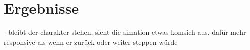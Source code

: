\chapter{Ergebnisse}

- bleibt der charakter stehen, sieht die aimation etwas komsich aus. dafür mehr responsive als wenn er zurück oder weiter steppen würde